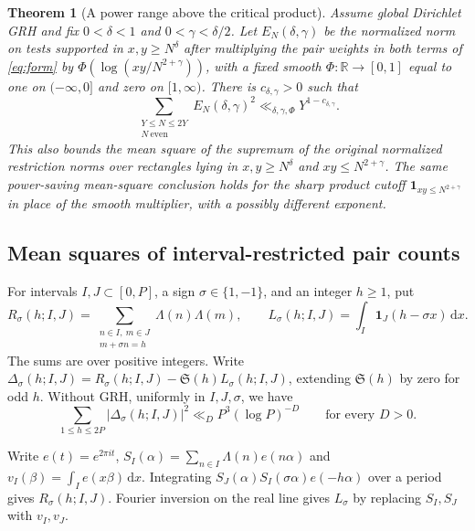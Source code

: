 \documentclass[11pt,a4paper]{article}
\numberwithin{equation}{section}
\newtheorem{theorem}{Theorem}[section]
\newcommand{\SSS}{\mathfrak S}
\newcommand{\ud}{\mathrm d}
\begin{document}
\begin{theorem}[A power range above the critical product]
\label{thm:powerproduct}
Assume global Dirichlet GRH and fix $0<\delta<1$ and
$0<\gamma<\delta/2$. Let $E_N(\delta,\gamma)$ be the
normalized norm on tests supported in $x,y\ge N^\delta$
after multiplying the pair weights in both terms of
\cref{eq:form} by $\Phi(\log(xy/N^{2+\gamma}))$, with a fixed
smooth $\Phi\colon\mathbb R\to[0,1]$ equal to one on
$(-\infty,0]$ and zero on $[1,\infty)$. There is
$c_{\delta,\gamma}>0$ such that
\begin{equation}
 \sum_{\substack{Y\le N\le2Y\\ N\ \mathrm{even}}}
 E_N(\delta,\gamma)^2
     \ll_{\delta,\gamma,\Phi}Y^{1-c_{\delta,\gamma}} .
 \label{eq:powerproduct}
\end{equation}
This also bounds the mean square of the supremum of the
original normalized restriction norms over rectangles lying
in $x,y\ge N^\delta$ and $xy\le N^{2+\gamma}$.
The same power-saving mean-square conclusion holds for the
sharp product cutoff $\mathbf 1_{xy\le N^{2+\gamma}}$ in place
of the smooth multiplier, with a possibly different exponent.
\end{theorem}

\subsection{Mean squares of interval-restricted pair counts}

For intervals $I,J\subset[0,P]$, a sign $\sigma\in\{1,-1\}$,
and an integer $h\ge1$, put
\[
 R_\sigma(h;I,J)=
   \sum_{\substack{n\in I,\ m\in J\\m+\sigma n=h}}
                  \Lambda(n)\Lambda(m),\qquad
 L_\sigma(h;I,J)=\int_I\mathbf1_J(h-\sigma x)\,\ud x .
\]
The sums are over positive integers. Write
$\Delta_\sigma(h;I,J)=R_\sigma(h;I,J)-\SSS(h)L_\sigma(h;I,J)$,
extending $\SSS(h)$ by zero for odd $h$. Without GRH, uniformly
in $I,J,\sigma$, we have
\begin{equation}
 \sum_{1\le h\le2P}|\Delta_\sigma(h;I,J)|^2
      \ll_D P^3(\log P)^{-D}
       \qquad\text{for every $D>0$}.
 \label{eq:pairlog}
\end{equation}

Write $e(t)=e^{2\pi it}$,
$S_I(\alpha)=\sum_{n\in I}\Lambda(n)e(n\alpha)$ and
$v_I(\beta)=\int_I e(x\beta)\,\ud x$. Integrating
$S_J(\alpha)S_I(\sigma\alpha)e(-h\alpha)$ over a period
gives $R_\sigma(h;I,J)$. Fourier inversion on the real line
gives $L_\sigma$ by replacing $S_I,S_J$ with $v_I,v_J$.
\end{document}
